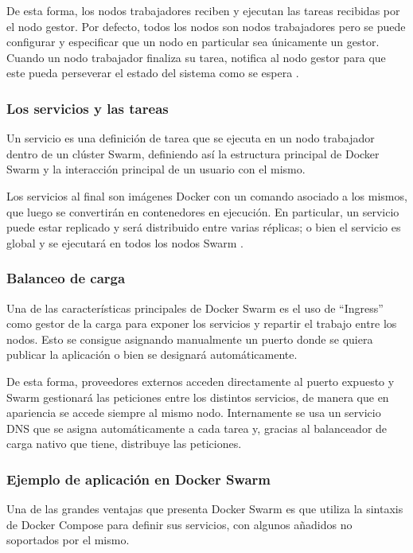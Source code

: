 De esta forma, los nodos trabajadores reciben y ejecutan las tareas recibidas por
el nodo gestor. Por defecto, todos los nodos son nodos trabajadores pero se puede
configurar y especificar que un nodo en particular sea únicamente un gestor.
Cuando un nodo trabajador finaliza su tarea, notifica al nodo gestor para que este
pueda perseverar el estado del sistema como se espera \autocite{SwarmModeKey2021}.

\subsubsection*{Los servicios y las tareas}
Un servicio es una definición de tarea que se ejecuta en un nodo trabajador dentro
de un clúster Swarm, definiendo así la estructura principal de Docker Swarm y la
interacción principal de un usuario con el mismo.

Los servicios al final son imágenes Docker con un comando asociado a los mismos,
que luego se convertirán en contenedores en ejecución. En particular, un servicio
puede estar replicado y será distribuido entre varias réplicas; o bien el
servicio es global y se ejecutará en todos los nodos Swarm \autocite{SwarmModeKey2021}.

\subsubsection*{Balanceo de carga}
Una de las características principales de Docker Swarm es el uso de ``Ingress'' como
gestor de la carga para exponer los servicios y repartir el trabajo entre los nodos.
Esto se consigue asignando manualmente un puerto donde se quiera publicar la 
aplicación o bien se designará automáticamente.

De esta forma, proveedores externos acceden directamente al puerto expuesto
y Swarm gestionará las peticiones entre los distintos servicios, de manera que
en apariencia se accede siempre al mismo nodo. Internamente se usa un servicio
DNS que se asigna automáticamente a cada tarea y, gracias al balanceador de carga
nativo que tiene, distribuye las peticiones.

\subsubsection*{Ejemplo de aplicación en Docker Swarm}
Una de las grandes ventajas que presenta Docker Swarm es que utiliza la
sintaxis de Docker Compose para definir sus servicios, con algunos añadidos
no soportados por el mismo.


